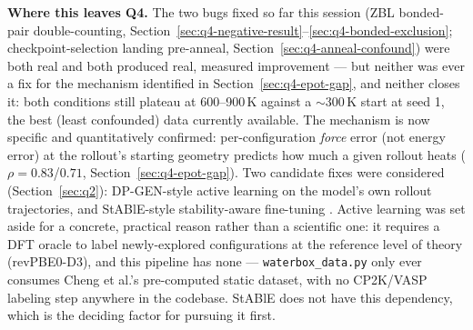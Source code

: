 \documentclass[11pt]{article}
\begin{document}
\textbf{Where this leaves Q4.} The two bugs fixed so far this session (ZBL
bonded-pair double-counting, Section~\ref{sec:q4-negative-result}--\ref{sec:q4-bonded-exclusion};
checkpoint-selection landing pre-anneal,
Section~\ref{sec:q4-anneal-confound}) were both real and both produced
real, measured improvement --- but neither was ever a fix for the
mechanism identified in Section~\ref{sec:q4-epot-gap}, and neither closes
it: both conditions still plateau at 600--900\,K against a $\sim$300\,K
start at seed 1, the best (least confounded) data currently available. The
mechanism is now specific and quantitatively confirmed: per-configuration
\emph{force} error (not energy error) at the rollout's starting geometry
predicts how much a given rollout heats ($\rho=0.83$/$0.71$,
Section~\ref{sec:q4-epot-gap}). Two candidate fixes were considered
(Section~\ref{sec:q2}): DP-GEN-style active learning on the model's own
rollout trajectories, and StABlE-style stability-aware fine-tuning
\citep{raja2025stable}. Active learning was set aside for a concrete,
practical reason rather than a scientific one: it requires a DFT oracle to
label newly-explored configurations at the reference level of theory
(revPBE0-D3), and this pipeline has none --- \texttt{waterbox\_data.py}
only ever consumes Cheng et al.'s pre-computed static dataset, with no
CP2K/VASP labeling step anywhere in the codebase. StABlE does not have
this dependency, which is the deciding factor for pursuing it first.
\end{document}
